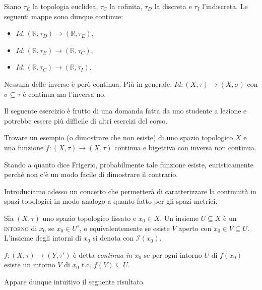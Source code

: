 \documentclass{article}
\begin{document}
\begin{ex}
	Siano $\tau_E$ la topologia euclidea, $\tau_C$ la cofinita, $\tau_D$ la
	discreta e $\tau_I$ l'indiscreta. Le seguenti mappe sono dunque continue:
    \begin{itemize}
	\item $Id:(\mathbb{R}, \tau_D) \rightarrow (\mathbb{R}, \tau_E)$,
    \item $Id:(\mathbb{R}, \tau_E) \rightarrow (\mathbb{R}, \tau_C)$,
    \item $Id:(\mathbb{R}, \tau_C) \rightarrow (\mathbb{R}, \tau_I)$.
    \end{itemize}
    Nessuna delle inverse è però continua. Più in generale, $Id: (X, \tau)
    \rightarrow (X, \sigma)$ con $\sigma \subsetneq \tau$ è continua ma
    l'inversa no.
\end{ex}

\begin{exc}
	Il seguente esercizio è frutto di una domanda fatta da uno studente a
	lezione e potrebbe essere più difficile di altri esercizi del corso.

    \marginpar{\warningsign}
	Trovare un esempio (o dimostrare che non esiste) di uno spazio topologico
	$X$ e una funzione $f: (X, \tau) \rightarrow (X, \tau)$ continua e bigettiva
	con inversa non continua.

    Stando a quanto dice Frigerio, probabilmente tale funzione esiste,
    euristicamente perché non c'è un modo facile di dimostrare il contrario.
\end{exc}

Introduciamo adesso un concetto che permetterà di caratterizzare la continuità in spazi topologici in modo analogo a quanto fatto per gli spazi metrici.

\begin{defn}
	Sia $(X, \tau)$ uno spazio topologico fissato e $x_0 \in X$. Un insieme $U
	\subseteq X$ è un \textsc{intorno} di $x_0$ se $x_0 \in
	U^{\circ}$, o equivalentemente se esiste $V$ aperto con $x_0 \in V
	\subseteq U$. L'insieme degli intorni di $x_0$ si denota con
	$\mathcal{I}(x_0)$.
\end{defn}

\begin{defn}
	$f:(X, \tau) \rightarrow (Y, \tau')$ è detta \textit{continua in $x_0$} se per ogni intorno $U$ di $f(x_0)$ esiste un intorno $V$ di $x_0$ t.c. $f(V) \subseteq U$.
\end{defn}

Appare dunque intuitivo il seguente risultato.
\end{document}
